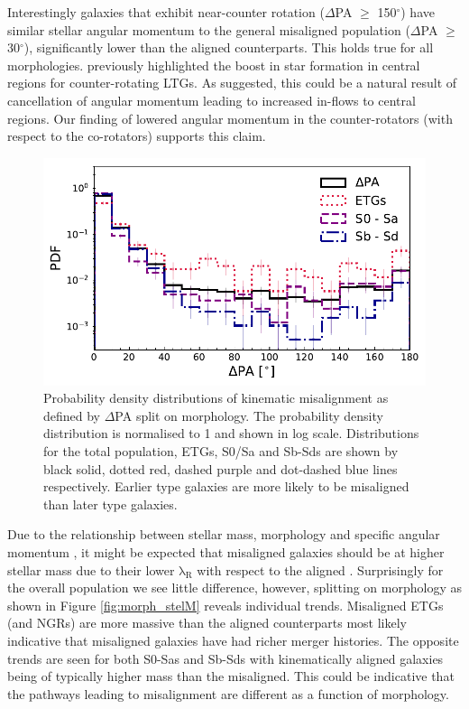 Interestingly galaxies that exhibit near-counter rotation ($\Delta$PA $\geq$ 150$^{\circ}$) have similar stellar angular momentum to the general misaligned population ($\Delta$PA $\geq$ 30$^{\circ}$), significantly lower than the aligned counterparts. This holds true for all morphologies. \citet{chen2016} previously highlighted the boost in star formation in central regions for counter-rotating LTGs. As suggested, this could be a natural result of cancellation of angular momentum leading to increased in-flows to central regions. Our finding of lowered angular momentum in the counter-rotators (with respect to the co-rotators) supports this claim.

\begin{figure}
	\includegraphics[width=\linewidth]{thesis/latex/misalignment_MaNGA/delPA_morph.pdf}
    \caption{Probability density distributions of kinematic misalignment as defined by $\Delta$PA split on morphology. The probability density distribution is normalised to 1 and shown in log scale. Distributions for the total population, ETGs, S0/Sa and Sb-Sds are shown by black solid, dotted red, dashed purple and dot-dashed blue lines respectively. Earlier type galaxies are more likely to be misaligned than later type galaxies.}
    \label{fig:morph_PA}
\end{figure}

Due to the relationship between stellar mass, morphology and specific angular momentum \citep[e.g.][]{cortese2016}, it might be expected that misaligned galaxies should be at higher stellar mass due to their lower $\mathrm{\lambda_{R}}$ with respect to the aligned \citep[see also;][]{bryant2019}. Surprisingly for the overall population we see little difference, however, splitting on morphology as shown in Figure \ref{fig:morph_stelM} reveals individual trends. Misaligned ETGs (and NGRs) are more massive than the aligned counterparts most likely indicative that misaligned galaxies have had richer merger histories. The opposite trends are seen for both S0-Sas and Sb-Sds with kinematically aligned galaxies being of typically higher mass than the misaligned. This could be indicative that the pathways leading to misalignment are different as a function of morphology.

